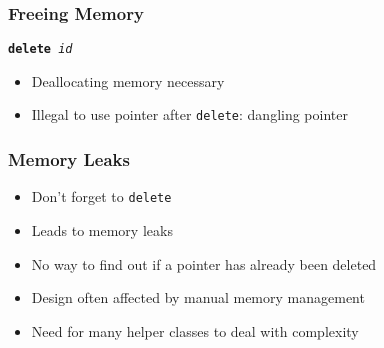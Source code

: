 \begin{frame}
  \frametitle{Freeing Memory}
  \begin{center}
    \tt {\bfseries delete} {\it id}
  \end{center}
  \begin{itemize}
    \item Deallocating memory necessary
    \item Illegal to use pointer after {\tt delete}: dangling pointer
  \end{itemize}
  \vskip5mm
\end{frame}

\begin{frame}
  \frametitle{Memory Leaks}
  \begin{itemize}
    \item Don't forget to \texttt{delete}
    \item Leads to memory leaks
    \item No way to find out if a pointer has already been deleted
    \item Design often affected by manual memory management
    \item Need for many helper classes to deal with complexity
  \end{itemize}
\end{frame}




